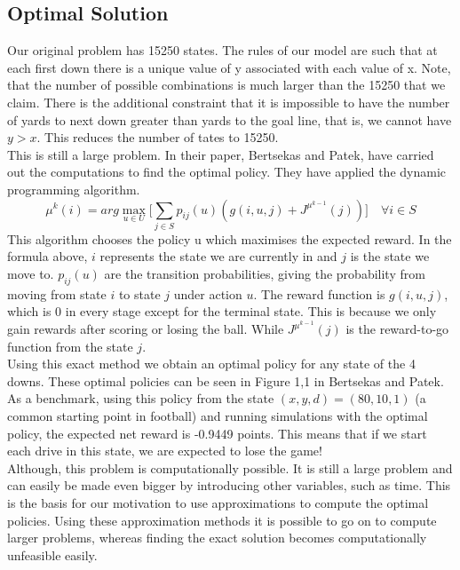 \documentclass[11pt, oneside]{article}   	%
\begin{document}
\subsection{Optimal Solution}
Our original problem has 15250 states. The rules of our model are such that at each first down there is a unique value of y associated with each value of x. Note, that the number of possible combinations is much larger than the 15250 that we claim. There is the additional constraint that it is impossible to have the number of yards to next down greater than yards to the goal line, that is, we cannot have $y>x$. This reduces the number of tates to 15250.\\

This is still a large problem. In their paper, Bertsekas and Patek, have carried out the computations to find the optimal policy. They have applied the dynamic programming algorithm.
$$
\mu^{k}(i) = arg\max\limits_{u \in U} \Big[ \sum\limits_{j \in S} p_{ij}(u)(g(i,u,j) +  J^{\mu^{k-1}}(j))\Big] \quad \forall i \in S
$$
This algorithm chooses the policy u  which maximises the expected reward. In the formula above, $i$ represents the state we are currently in and $j$ is the state we move to. $p_{ij}(u)$ are the transition probabilities, giving the probability from moving from state $i$ to state $j$ under action $u$. The reward function is $g(i,u,j)$, which is 0 in every stage except for the terminal state. This is because we only gain rewards after scoring or losing the ball. While $J^{\mu^{k-1}}(j)$ is the reward-to-go  function from the state $j$. \\

Using this exact method we obtain an optimal policy for any state of the 4 downs. These optimal policies can be seen in Figure 1,1 in Bertsekas and Patek. As a benchmark, using this policy from the state $(x,y,d)=(80,10,1)$ (a common starting point in football) and running simulations with the optimal policy, the expected net reward is -0.9449 points. This means that if we start each drive in this state, we are expected to lose the game! \\

Although, this problem is computationally possible. It is still a large problem and can easily be made even bigger by introducing other variables, such as time. This is the basis for our motivation to use approximations to compute the optimal policies. Using these approximation methods it is possible to go on to compute larger problems, whereas finding the exact solution becomes computationally unfeasible easily.
\end{document}
